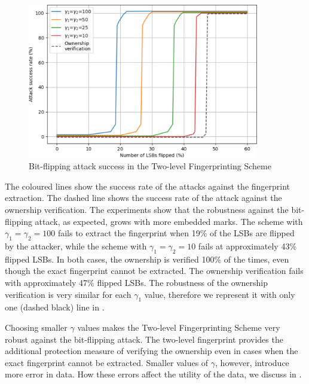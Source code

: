 \begin{figure}[ht]
    \centering
    \includegraphics[width=0.9\textwidth]{Figures/bit-flip-two-level-screensh.png}
    \caption{Bit-flipping attack success in the Two-level Fingerprinting Scheme}
    \label{fig:bit-flip-two-level-fp}
\end{figure}

The coloured lines show the success rate of the attacks against the fingerprint extraction. 
The dashed line shows the success rate of the attack against the ownership verification.
The experiments show that the robustness against the bit-flipping attack, as expected, grows with more embedded marks.
The scheme with $\gamma_1=\gamma_2=100$ fails to extract the fingerprint when 19\% of the LSBs are flipped by the attacker, while the scheme with $\gamma_1=\gamma_2=10$ fails at approximately 43\% flipped LSBs.
In both cases, the ownership is verified 100\% of the times, even though the exact fingerprint cannot be extracted. 
The ownership verification fails with approximately 47\% flipped LSBs. 
The robustness of the ownership verification is very similar for each $\gamma_1$ value, therefore we represent it with only one (dashed black) line in .

Choosing smaller $\gamma$ values makes the Two-level Fingerprinting Scheme very robust against the bit-flipping attack. The two-level fingerprint provides the additional protection measure of verifying the ownership even in cases when the exact fingerprint cannot be extracted. 
Smaller values of $\gamma$, however, introduce more error in data. How these errors affect the utility of the data, we discuss in .